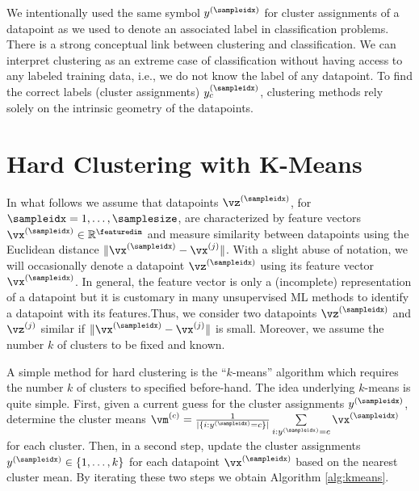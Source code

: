 \documentclass[12pt]{report}
\begin{document}
We intentionally used the same symbol $y^{(\sampleidx)}$ for cluster assignments of a 
datapoint as we used to denote an associated label in classification problems. There is 
a strong conceptual link between clustering and classification. We can interpret clustering 
as an extreme case of classification without having access to any labeled training data, i.e., 
we do not know the label of any datapoint. To find the correct labels (cluster assignments) 
$y_{c}^{(\sampleidx)}$, clustering methods rely solely on the intrinsic geometry of the datapoints. 

\newpage
\section{Hard Clustering with K-Means}
\label{sec_hard_clustering}

In what follows we assume that datapoints $\vz^{(\sampleidx)}$, for $\sampleidx=1,\ldots,\samplesize$, 
are characterized by feature vectors $\vx^{(\sampleidx)} \in \mathbb{R}^{\featuredim}$ and measure 
similarity between datapoints using the Euclidean distance $\| \vx^{(\sampleidx)} - \vx^{(j)} \|$. 
With a slight abuse of notation, we will occasionally denote a datapoint $\vz^{(\sampleidx)}$ 
using its feature vector $\vx^{(\sampleidx)}$. In general, the feature vector is only a (incomplete) 
representation of a datapoint but it is customary in many unsupervised ML methods to identify a 
datapoint with its features.Thus, we consider two datapoints $\vz^{(\sampleidx)}$ and $\vz^{(j)}$ 
similar if $\| \vx^{(\sampleidx)} - \vx^{(j)} \|$ is small. Moreover, we assume the number $k$ of clusters 
to be fixed and known. 

A simple method for hard clustering is  the ``$k$-means'' algorithm which requires the number $k$ of 
clusters to specified before-hand. The idea underlying $k$-means is quite simple. First, given a current 
guess for the cluster assignments $y^{(\sampleidx)}$, determine the 
cluster means $\vm^{(c)} = \frac{1}{|\{i: y^{(\sampleidx)}= c\}|} \sum\limits_{i: y^{(\sampleidx)}=c} \vx^{(\sampleidx)}$ 
for each cluster. Then, in a second step, update the cluster assignments $y^{(\sampleidx)} \in \{1,\ldots,k\}$ 
for each datapoint $\vx^{(\sampleidx)}$ based on the nearest cluster 
mean. By iterating these two steps we obtain Algorithm \ref{alg:kmeans}. 
\end{document}
